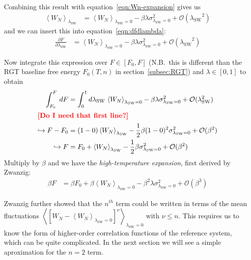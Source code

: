 \documentclass[letterpaper,twocolumn,amsmath,amssymb,prb]{revtex4-1}
\newcommand{\lambdaSW}{\ensuremath{\lambda_\text{SW}}}
\newcommand{\1}{\ensuremath{\textbf{r}_1}}
\newcommand{\2}{\ensuremath{\textbf{r}_2}}
\newcommand{\3}{\ensuremath{\textbf{r}_3}}
\newcommand{\4}{\ensuremath{\textbf{r}_4}}
\newcommand{\fixme}[1]{\textcolor{red}{\textbf{[#1]}}}
\begin{document}
Combining this result with equation~\ref{eqn:Wn-expansion} gives us
\begin{align}
  \left\langle W_N \right\rangle_{\lambdaSW} &= \left\langle W_N\right\rangle_{\lambdaSW = 0} - \beta\lambda\sigma_{\lambdaSW=0}^2 + \mathcal{O}(\lambdaSW^2) \label{eqn:Wn-expansion-simplified}
\end{align}
and we can insert this into equation~\ref{eqn:dfdlambda}:
\begin{align}
  \frac{\partial F}{\partial\lambdaSW} &= \left\langle W_N\right\rangle_{\lambdaSW = 0} - \beta\lambda\sigma_{\lambdaSW=0}^2 + \mathcal{O}(\lambdaSW^2)
\end{align}

Now integrate this expression over $F\in[F_0,F]$ (\textsc{N.B.}~this is different than the RGT baseline free energy $F_0(T,n)$ in section~\ref{subsec:RGT}) and $\lambda\in[0,1]$ to obtain
\begin{align}
  \int_{F_0}^F\, dF &= \int_0^1 d\lambdaSW\, \left\langle W_N\right\rangle_{\lambdaSW = 0} - \beta\lambda\sigma_{\lambdaSW=0}^2 + \mathcal{O}(\lambdaSW^2) \nonumber \\
  \intertext{\fixme{Do I need that first line?}}
  \hookrightarrow F - F_0 &= (1-0)\left\langle W_N \right\rangle_{\lambdaSW} - \frac{1}{2}\beta(1 - 0)^2\sigma_{\lambdaSW=0}^2 + \mathcal{O}(\beta^2) \nonumber \\
  \hookrightarrow F &= F_0 + \left\langle W_N \right\rangle_{\lambdaSW} - \frac{1}{2}\beta\sigma_{\lambdaSW=0}^2 + \mathcal{O}(\beta^2) \label{eqn:F-inTermsW}
\end{align}
Multiply by $\beta$ and we have the \emph{high-temperature expansion}, first derived by
Zwanzig:\cite{Zwanzig54}
\begin{align}
  \beta F &= \beta F_0 + \beta \left\langle W_N \right\rangle_{\lambdaSW=0} - \beta^2\lambda\sigma_{\lambdaSW=0}^2 + \mathcal{O}(\beta^3)
\end{align}

Zwanzig further showed that the $n^{th}$ term could be written in
terms of the mean fluctuations $\left\langle \left[ W_N - \left\langle
  W_N\right\rangle_{\lambdaSW=0} \right]^\nu \right\rangle_{\lambdaSW=0}$
with $\nu \leq n$. This requires us to know the form of higher-order
correlation functions of the reference system, which can be quite
complicated. In the next section we will see a simple aproximation for
the $n=2$ term.
\end{document}
